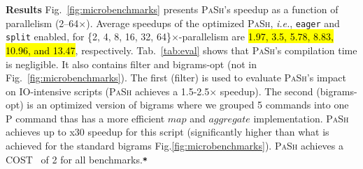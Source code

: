 \documentclass[sigplan, review, screen, anonymous]{acmart}
\newcommand{\ie}{{\em i.e.}, }
\newcommand{\etc}{{\em etc.}\xspace}
\newcommand{\heading}[1]{\vspace{4pt}\noindent\textbf{#1}\enspace}
\newcommand{\ttt}[1]{\texttt{#1}}
\newcommand{\tcn}[1]{\mbox{\textcircled{\scriptsize #1}}}
\newcommand{\tpur}{\tcn{\textsc{P}}\xspace}
\newcommand{\todo}[1]{\hl{#1}\xspace}
\newcommand{\nv}[1]{[{\color{cyan}nv: #1}]}
\newcommand{\kk}[1]{[{\color{magenta}kk: #1}]}
\newcommand{\str}{{\color{red}\textbf{\ttt{*}}}}
\newcommand{\sys}{{\scshape PaSh}\xspace}
\begin{document}
\heading{Results}
Fig.~\ref{fig:microbenchmarks} presents \sys's speedup as a function of parallelism (2--64$\times$).
Average speedups of the optimized \sys, \ie \ttt{eager} and \ttt{split} enabled, for \{2, 4, 8, 16, 32, 64\}$\times$-parallelism are \todo{1.97, 3.5, 5.78, 8.83, 10.96, and 13.47}, respectively.
%
Tab.~\ref{tab:eval} shows that \sys's compilation time is negligible. %
It also contains filter and bigrams-opt (not in Fig.~\ref{fig:microbenchmarks}). The first (filter) is used to evaluate \sys's impact on IO-intensive scripts (\sys achieves a 1.5-2.5$\times$ speedup). The second (bigrams-opt) is an optimized version of bigrams where we grouped 5 commands into one \tpur command thas has a more efficient $map$ and $aggregate$ implementation. \sys achieves up to x30 speedup for this script (significantly higher than what is achieved for the standard bigrams Fig.\ref{fig:microbenchmarks}).
\sys achieves a COST~\cite{mcsherryscalability} of 2 for all benchmarks.\str
\end{document}

